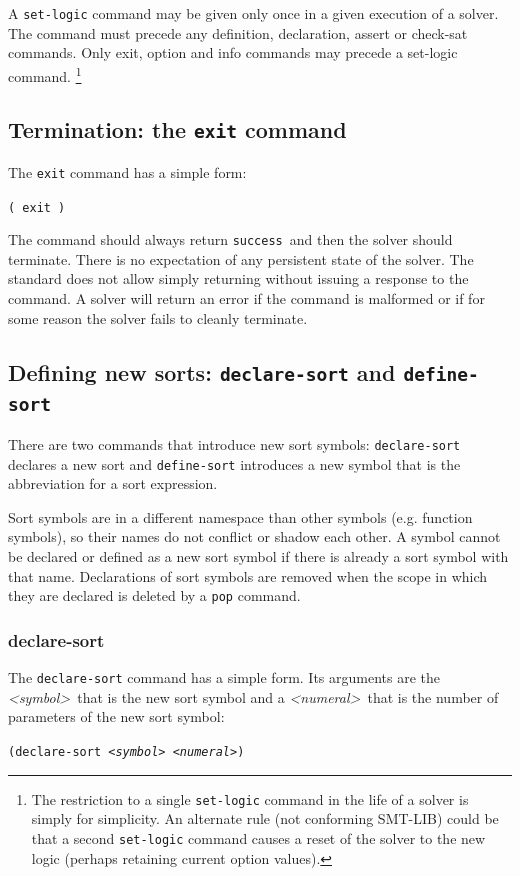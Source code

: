 \documentclass[12pt,oneside]{report}
\newcommand{\success}{{\tt success}}
\newcommand{\sym}{{\it <symbol>}}
\newcommand{\numeral}{{\it <numeral>}}
\begin{document}
A {\tt set-logic} command may be given only once in a given execution of a solver.  The command must precede any definition, declaration, assert or check-sat commands.  Only exit, option and info commands may precede a set-logic command.
\footnote{The restriction to a single {\tt set-logic} command in the life of a solver is
simply for simplicity.  An alternate rule (not conforming SMT-LIB) could be that a second {\tt set-logic} command causes a reset of the solver to the new logic (perhaps retaining current option values).}

\subsection{Termination: the {\tt exit} command}

The {\tt exit} command has a simple form:\\
\centerline{\tt ( exit ) } 

The command should always return \success~and then the solver should terminate.  There is no
expectation of any persistent state of the solver.  The standard does not allow simply returning without issuing a response to the command.
A solver will return an error if the command is malformed or if for some reason the solver fails to cleanly terminate.

\subsection{Defining new sorts: {\tt declare-sort} and {\tt define-sort}}
\label{SortCommands}

There are two commands that introduce new sort symbols: {\tt declare-sort} declares a new sort
and {\tt define-sort} introduces a new symbol
that is the abbreviation for a sort expression.

Sort symbols are in a different namespace than  other symbols (e.g. function symbols), so their
names do not conflict or shadow each other. 
A symbol cannot be declared or defined as a new
sort symbol if there is already a sort symbol
with that name.
Declarations of sort symbols are removed when the
scope in which they are declared is deleted by a 
{\tt pop} command.

\subsubsection{declare-sort}

The {\tt declare-sort} command has a simple form.  Its arguments are the \sym\ that is the new sort
symbol and a \numeral\ that is the number of parameters of the new sort symbol:\\
\centerline{\tt (declare-sort \sym\ \numeral)}
\end{document}
